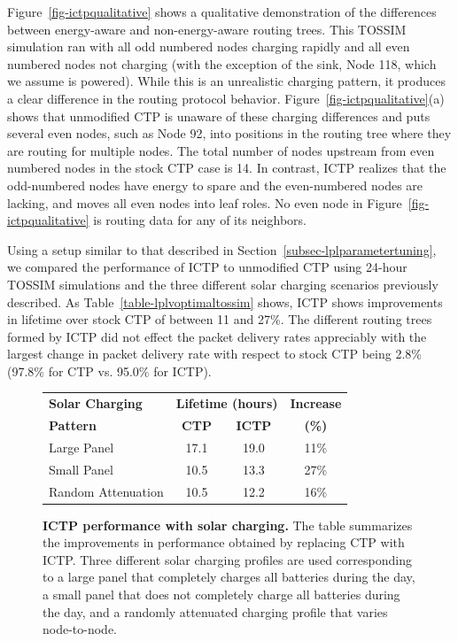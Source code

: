 Figure~\ref{fig-ictpqualitative} shows a qualitative demonstration of the
differences between energy-aware and non-energy-aware routing trees. This
TOSSIM simulation ran with all odd numbered nodes charging rapidly and all
even numbered nodes not charging (with the exception of the sink, Node 118,
which we assume is powered).  While this is an unrealistic charging pattern,
it produces a clear difference in the routing protocol behavior.
Figure~\ref{fig-ictpqualitative}(a) shows that unmodified CTP is unaware of
these charging differences and puts several even nodes, such as Node 92, into
positions in the routing tree where they are routing for multiple nodes. The
total number of nodes upstream from even numbered nodes in the stock CTP case
is 14. In contrast, ICTP realizes that the odd-numbered nodes have energy to
spare and the even-numbered nodes are lacking, and moves all even nodes into
leaf roles. No even node in Figure~\ref{fig-ictpqualitative} is routing data
for any of its neighbors.

Using a setup similar to that described in
Section~\ref{subsec-lplparametertuning}, we compared the performance of ICTP
to unmodified CTP using 24-hour TOSSIM simulations and the three different
solar charging scenarios previously described. As
Table~\ref{table-lplvoptimaltossim} shows, ICTP shows improvements in
lifetime over stock CTP of between 11 and 27\%. The different routing trees
formed by ICTP did not effect the packet delivery rates appreciably with the
largest change in packet delivery rate with respect to stock CTP being 2.8\%
(97.8\% for CTP vs. 95.0\% for ICTP).

\begin{figure}[t]
\begin{small}
\begin{center}
\begin{tabular}{|l|ccc|}
\hline
\textbf{Solar Charging} & \multicolumn{2}{c}{\textbf{Lifetime (hours)}} & \textbf{Increase} \\
\textbf{Pattern} & \textbf{CTP} & \textbf{ICTP} & \textbf{(\%)} \\ \hline
Large Panel & 17.1 & 19.0 & 11\% \\
Small Panel & 10.5 & 13.3 & 27\% \\
Random Attenuation & 10.5 & 12.2 & 16\% \\ \hline
\end{tabular}
\end{center}
\end{small}
\caption{\small{\textbf{ICTP performance with solar charging.}
The table summarizes the improvements in performance obtained by replacing
CTP with ICTP. Three different solar charging profiles are used corresponding
to a large panel that completely charges all batteries during the day, a
small panel that does not completely charge all batteries during the day, and a randomly
attenuated charging profile that varies node-to-node.}}
\label{table-ictpvoptimaltossim}
\end{figure}


